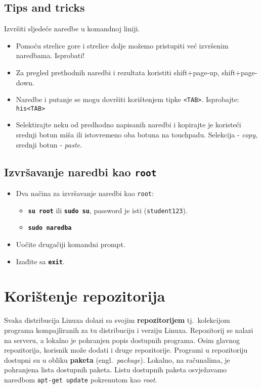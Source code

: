 \subsection*{Tips and tricks}
\begin{zadatak}
Izvršiti sljedeće naredbe u komandnoj liniji.
\begin{itemize}
 \item Pomoću strelice gore i strelice dolje možemo pristupiti već izvršenim naredbama. Isprobati!
\item Za pregled prethodnih naredbi i rezultata koristiti shift+page-up, shift+page-down.
\item Naredbe i putanje se mogu dovršiti korištenjem tipke \texttt{<TAB>}. Isprobajte: \texttt{his<TAB>}
\item Selektirajte neku od predhodno napisanih naredbi i kopirajte je koristeći srednji botun miša ili istovremeno oba botuna na touchpadu. Selekcija - \textit{copy}, srednji botun - \textit{paste}.
\end{itemize}
\end{zadatak}
\subsection*{Izvršavanje naredbi kao \texttt{root}}
\begin{itemize}
 \item Dva načina za izvršavanje naredbi kao \texttt{root}: \begin{itemize}
\item \textbf{\texttt{su root}} ili \textbf{\texttt{sudo su}}, password je isti (\texttt{student123}).
\item \textbf{\texttt{sudo naredba}} 
 \end{itemize}
\item Uočite drugačiji komandni prompt.
\item Izađite sa \textbf{\texttt{exit}}.
\end{itemize}
\section{Korištenje repozitorija}
Svaka distribucija Linuxa dolazi sa svojim \textbf{repozitorijem} tj.~kolekcijom programa kompajliranih za tu distribuciju i verziju Linuxa. Repozitorij se nalazi na serveru, a lokalno je pohranjen popis dostupnih programa. Osim glavnog repozitorija, korisnik može dodati i druge repozitorije. Programi u repozitoriju dostupni su u obliku \textbf{paketa} (engl.~\textit{package}). Lokalno, na računalima, je pohranjena lista dostupnih paketa. Listu dostupnih paketa osvježavamo naredbom \lstinline!apt-get update! pokrenutom kao \textit{root}. 

